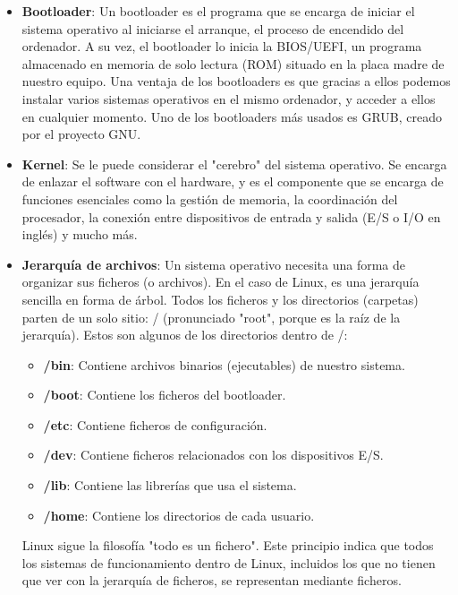 \begin{itemize}
    \item \textbf{Bootloader}: Un bootloader es el programa que se encarga de iniciar el sistema operativo al iniciarse el arranque, el proceso de encendido del ordenador. A su vez, el bootloader lo inicia la BIOS/UEFI, un programa almacenado en memoria de solo lectura (ROM) situado en la placa madre de nuestro equipo. Una ventaja de los bootloaders es que gracias a ellos podemos instalar varios sistemas operativos en el mismo ordenador, y acceder a ellos en cualquier momento. Uno de los bootloaders más usados es GRUB, creado por el proyecto GNU.

    \item \textbf{Kernel}: Se le puede considerar el "cerebro" del sistema operativo. Se encarga de enlazar el software con el hardware, y es el componente que se encarga de funciones esenciales como la gestión de memoria, la coordinación del procesador, la conexión entre dispositivos de entrada y salida (E/S o I/O en inglés) y mucho más.

    \item \textbf{Jerarquía de archivos}: Un sistema operativo necesita una forma de organizar sus ficheros (o archivos). En el caso de Linux, es una jerarquía sencilla en forma de árbol. Todos los ficheros y los directorios (carpetas) parten de un solo sitio: / (pronunciado "root", porque es la raíz de la jerarquía). Estos son algunos de los directorios dentro de /:

    \begin{itemize}
        \item \textbf{/bin}: Contiene archivos binarios (ejecutables) de nuestro sistema.
        \item \textbf{/boot}: Contiene los ficheros del bootloader.
        \item \textbf{/etc}: Contiene ficheros de configuración.
        \item \textbf{/dev}: Contiene ficheros relacionados con los dispositivos E/S.
        \item \textbf{/lib}: Contiene las librerías que usa el sistema.
        \item \textbf{/home}: Contiene los directorios de cada usuario.
    \end{itemize}

    	Linux sigue la filosofía "todo es un fichero". Este principio indica que todos los sistemas de funcionamiento dentro de Linux, incluidos los que no tienen que ver con la jerarquía de ficheros, se representan mediante ficheros.


\end{itemize}
